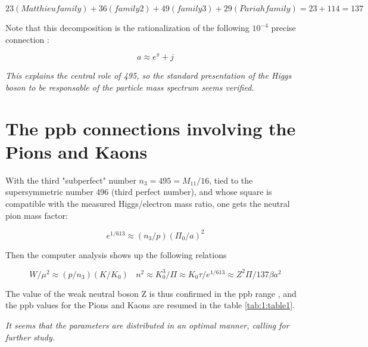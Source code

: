 \documentclass[a4paper,9pt]{article}
\begin{document}
\begin{equation}
23 (Matthieu family) + 36 (family 2) + 49 (family 3) + 29 (Pariah family) = 23 + 114 = 137 
\end{equation}

Note that this decomposition is the rationalization of the following $10^{-4} $ precise connection \cite{Sanchez}:


\begin{equation}
a \approx e^{\pi} + j   
\end{equation}

\textit{This explains the central role of 495, so the standard presentation of the Higgs boson to be responsable of the particle mass spectrum seems verified.}







\section{The ppb connections involving the Pions and Kaons}

With the third "subperfect" number $n_3 = 495 = M_{11}/16$, tied to the supersymmetric number 496 (third perfect number), and whose square is compatible with the measured Higgs/electron mass ratio, one gets the neutral pion mass factor:  

\begin{equation}
e^{1/613} \approx (n_3/p)(\Pi_0/a)^2  
\end{equation}

Then the computer analysis shows up the following relations

\begin{equation}
W/\mu^2 \approx (p/n_3)(K/K_0)~~~~   n^2 \approx K_0^3/\Pi  \approx K_0 \tau/e^{1/613} \approx Z^2\Pi/137\beta a^2
\end{equation}


The value of the weak neutral boson Z is thus confirmed in the ppb range \cite{Sanchez}, and the ppb values for the Pions and Kaons are resumed in the table \ref{tab:1:table1}.  


\textit{It seems that the parameters are distributed in an optimal manner, calling for further study.}
\end{document}
